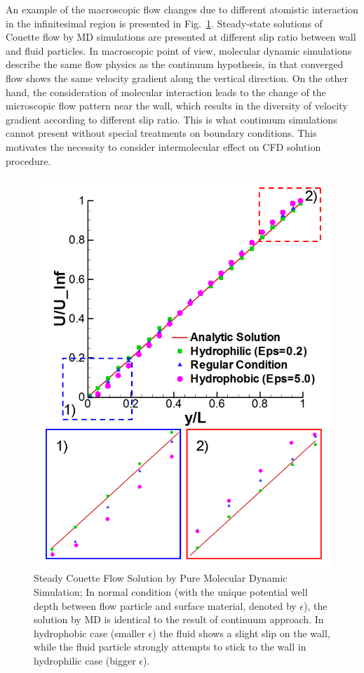 \documentclass[conference,final]{IEEEtran}
\newcommand{\skonote}[1]{ {\textcolor{blue} { ***Jeff: #1 }}}
\newcommand{\skonote}[1]{}
\begin{document}
An example of the macroscopic flow changes due to different atomistic interaction in the infinitesimal region is presented in Fig.~\ref{MD_Solution_New}. Steady-state solutions of Couette flow by MD simulations are presented at different slip ratio between wall and fluid particles. In macroscopic point of view, molecular dynamic simulations describe the same flow physics as the continuum hypothesis, in that converged flow shows the same velocity gradient along the vertical direction. On the other hand, the consideration of molecular interaction leads to the change of the microscopic flow pattern near the wall, which results in the diversity of velocity gradient according to different slip ratio. This is what continuum simulations cannot present without special treatments on boundary conditions. This motivates the necessity to consider intermolecular effect on CFD solution procedure.

%
\begin{figure}[ht]
\centering
\includegraphics[width=0.9\linewidth]{MD_Solution_New.pdf}
\vskip-0.2cm
\caption{\small Steady Couette Flow Solution by Pure Molecular Dynamic Simulation; In normal condition (with the unique potential well depth between flow particle and surface material, denoted by $\epsilon$), the solution by MD is identical to the result of continuum approach. In hydrophobic case (smaller $\epsilon$) the fluid shows a slight slip on the wall, while the fluid particle strongly attempts to stick to the wall in hydrophilic case (bigger $\epsilon$).}
\label{MD_Solution_New}
\end{figure}
\end{document}
